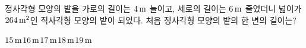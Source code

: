 정사각형 모양의 밭을 가로의 길이는 $4\mkern3mu \mathrm{m}$ 늘이고, 세로의 길이는 $6\mkern3mu \mathrm{m}$ 줄였더니 넓이가 $264\mkern3mu \mathrm{m}^2$인 직사각형 모양의 밭이 되었다. 처음 정사각형 모양의 밭의 한 변의 길이는?
\begin{choices32}{$15\mkern3mu \mathrm{m}$}{$16\mkern3mu \mathrm{m}$}{$17\mkern3mu \mathrm{m}$}{$18\mkern3mu \mathrm{m}$}{$19\mkern3mu \mathrm{m}$}\end{choices32}
